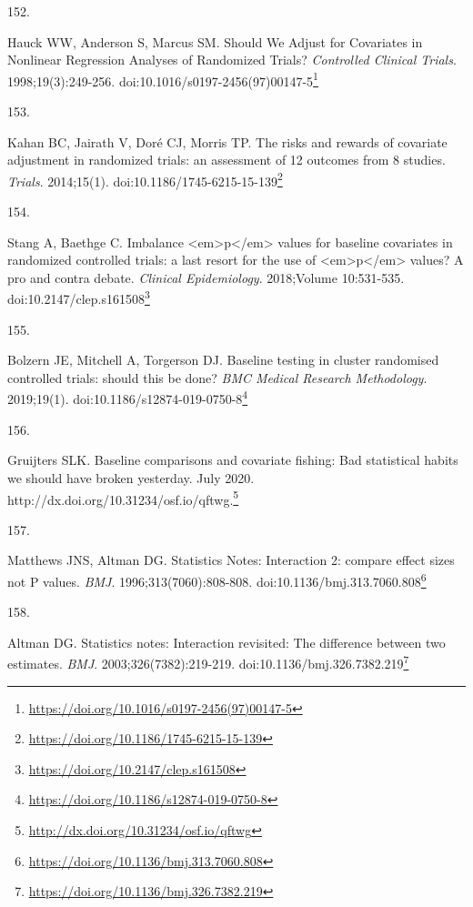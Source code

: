 \documentclass[
  a4paper,
]{book}
\newlength{\cslhangindent}
\newlength{\csllabelwidth}
\newlength{\cslentryspacingunit} %
\newenvironment{CSLReferences}[2] %
 {%
  \setlength{\parindent}{0pt}
  \ifodd #1
  \let\oldpar\par
  \def\par{\hangindent=\cslhangindent\oldpar}
  \fi
  \setlength{\parskip}{#2\cslentryspacingunit}
 }%
 {}
\newcommand{\CSLLeftMargin}[1]{\parbox[t]{\csllabelwidth}{#1}}
\newcommand{\CSLRightInline}[1]{\parbox[t]{\linewidth - \csllabelwidth}{#1}\break}
\renewcommand{\href}[2]{#2\footnote{\url{#1}}}
\begin{document}
\begin{CSLReferences}{0}{0}
\leavevmode{}%
\CSLLeftMargin{152. }%
\CSLRightInline{Hauck WW, Anderson S, Marcus SM. Should We Adjust for Covariates in Nonlinear Regression Analyses of Randomized Trials? \emph{Controlled Clinical Trials}. 1998;19(3):249-256. doi:\href{https://doi.org/10.1016/s0197-2456(97)00147-5}{10.1016/s0197-2456(97)00147-5}}

\leavevmode{}%
\CSLLeftMargin{153. }%
\CSLRightInline{Kahan BC, Jairath V, Doré CJ, Morris TP. The risks and rewards of covariate adjustment in randomized trials: an assessment of 12 outcomes from 8 studies. \emph{Trials}. 2014;15(1). doi:\href{https://doi.org/10.1186/1745-6215-15-139}{10.1186/1745-6215-15-139}}

\leavevmode{}%
\CSLLeftMargin{154. }%
\CSLRightInline{Stang A, Baethge C. Imbalance \textless em\textgreater p\textless/em\textgreater{} values for baseline covariates in randomized controlled trials: a last resort for the use of \textless em\textgreater p\textless/em\textgreater{} values? A pro and contra debate. \emph{Clinical Epidemiology}. 2018;Volume 10:531-535. doi:\href{https://doi.org/10.2147/clep.s161508}{10.2147/clep.s161508}}

\leavevmode{}%
\CSLLeftMargin{155. }%
\CSLRightInline{Bolzern JE, Mitchell A, Torgerson DJ. Baseline testing in cluster randomised controlled trials: should this be done? \emph{BMC Medical Research Methodology}. 2019;19(1). doi:\href{https://doi.org/10.1186/s12874-019-0750-8}{10.1186/s12874-019-0750-8}}

\leavevmode{}%
\CSLLeftMargin{156. }%
\CSLRightInline{Gruijters SLK. Baseline comparisons and covariate fishing: Bad statistical habits we should have broken yesterday. July 2020. \href{http://dx.doi.org/10.31234/osf.io/qftwg}{http://dx.doi.org/10.31234/osf.io/qftwg.}}

\leavevmode{}%
\CSLLeftMargin{157. }%
\CSLRightInline{Matthews JNS, Altman DG. Statistics Notes: Interaction 2: compare effect sizes not P values. \emph{BMJ}. 1996;313(7060):808-808. doi:\href{https://doi.org/10.1136/bmj.313.7060.808}{10.1136/bmj.313.7060.808}}

\leavevmode{}%
\CSLLeftMargin{158. }%
\CSLRightInline{Altman DG. Statistics notes: Interaction revisited: The difference between two estimates. \emph{BMJ}. 2003;326(7382):219-219. doi:\href{https://doi.org/10.1136/bmj.326.7382.219}{10.1136/bmj.326.7382.219}}


\end{CSLReferences}
\end{document}

